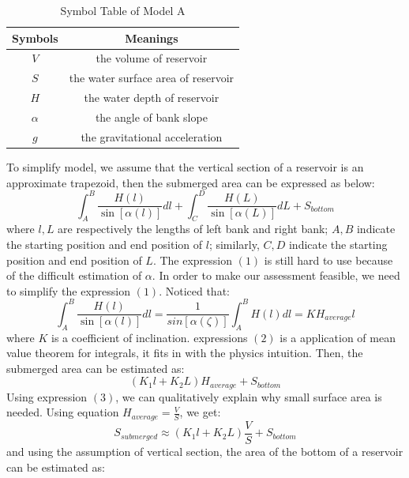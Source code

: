 \documentclass{mcmthesis}
\begin{document}
\begin{table}[!ht]
\centering
  \begin{tabular}{cc}
  \hline
  Symbols & Meanings \\
  \hline
  $V$ & the volume of reservoir \\
  $S$ & the water surface area of reservoir \\
  $H$ & the water depth of reservoir \\
  $\alpha$ & the angle of bank slope \\
  $g$ & the gravitational acceleration \\
  \hline
  \end{tabular}
\caption{Symbol Table of Model A}
\end{table}

\indent To simplify model, we assume that the vertical section of a reservoir is an approximate trapezoid, then the submerged area can be expressed as below:
\begin{equation}\int_{A}^{B}\frac{H\left(l\right)}{\sin\left[\alpha\left(l\right)\right]}dl + \int_{C}^{D}\frac{H\left(L\right)}{\sin\left[\alpha\left(L\right)\right]}dL + S_{bottom}\end{equation}
where $l, L$ are respectively the lengths of left bank and right bank; $A, B$ indicate the starting position and end position of $l$; similarly, $C, D$ indicate the starting position and end position of $L$.
The expression $\left(1\right)$ is still hard to use because of the difficult estimation of $\alpha$. In order to make our assessment feasible, we need to simplify the expression $\left(1\right)$. Noticed that:
\begin{equation}
\int_{A}^{B}\frac{H\left(l\right)}{\sin\left[\alpha\left(l\right)\right]}dl = \frac{1}{sin\left[\alpha\left(\zeta\right)\right]}\int_{A}^{B}H\left(l\right)dl
= KH_{average}l
\end{equation}
where $K$ is a coefficient of inclination. expressions $\left(2\right)$ is a application of mean value theorem for integrals, it fits in with the physics intuition. Then, the submerged area can be estimated as:
\begin{equation}
\left(K_{1}l + K_{2}L\right)H_{average} + S_{bottom}
\end{equation}
Using expression $\left(3\right)$, we can qualitatively explain why small surface area is needed. Using equation $H_{average} = \frac{V}{S}$, we get:
\[S_{submerged} \approx \left(K_{1}l + K_{2}L\right)\frac{V}{S} + S_{bottom}\]
and using the assumption of vertical section, the area of the bottom of a reservoir can be estimated as:\\
\end{document}
